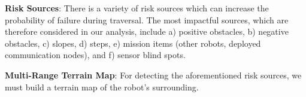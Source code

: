 \documentclass[letterpaper, 10pt, conference]{ieeeconf}      %
\newcommand{\ph}[1]{{\textbf{#1}:}} %
\newcommand{\rev}[1]{{\color{blue} #1 }} %
\begin{document}
\ph{Risk Sources}
There is a variety of risk sources which can increase the probability of failure during traversal.
The most impactful sources, which are therefore considered in our analysis, include a) positive obstacles, b) negative obstacles, c) slopes, d) steps, e) mission items (other robots, deployed communication nodes), and f) sensor blind spots.


\rev{\ph{Multi-Range Terrain Map}}
For detecting the aforementioned risk sources, we must build a terrain map of the robot's surrounding.
\end{document}
